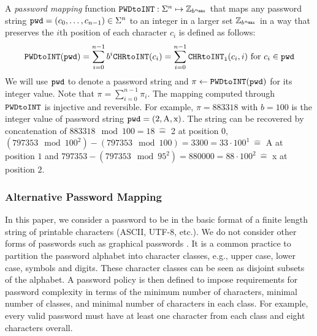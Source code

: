 A \emph{password mapping} function $\texttt{PWDtoINT}:\Sigma^n\mapsto\mathbb{Z}_{b^{{n_\mathtt{max}}}}$ that maps any password string $\mathtt{pwd}=(c_{0},\dots,c_{n-1})\in\Sigma^n$ to an integer in a larger set $\mathbb{Z}_{b^{{n_\mathtt{max}}}}$ in a way that preserves the $i$th position of each character $c_i$ is defined as follows:
\[
\texttt{PWDtoINT}(\mathtt{pwd}) = \sum_{i=0}^{n-1}b^{i} \texttt{CHRtoINT}(c_{i}) = \sum_{i=0}^{n-1}\texttt{CHRtoINT}_\texttt{i}(c_i, i) \textrm{ for } c_i\in\mathtt{pwd}
\]
We will use $\mathtt{pwd}$ to denote a password string and $\pi \gets \texttt{PWDtoINT}(\mathtt{pwd})$ for its integer value. Note that $\pi = \sum_{i=0}^{n-1}\pi_i$. %
The mapping computed through $\texttt{PWDtoINT}$ is injective and reversible. For example, $\pi = 883318$ with $b=100$ is the integer value of password string $\mathtt{pwd} = (\textrm{2},\textrm{A},\textrm{x})$. The string can be recovered by concatenation of $883318\mod 100=18~ \widehat{=}$ 2 at position 0, $(797353\mod 100^2)-(797353\mod 100)=3300=33\cdot 100^1~ \widehat{=}$ A at position $1$ and $797353-(797353\mod95^2)=880000=88\cdot 100^2~ \widehat{=}$ x at position $2$.

\subsubsection{Alternative Password Mapping}
In this paper, we consider a password to be in the basic format of a finite length string of printable characters (ASCII, UTF-8, etc.). 
We do not consider other forms of passwords such as graphical passwords \cite{suo05}. 
It is a common practice to partition the password alphabet into character classes, e.g., upper case, lower case, symbols and digits. 
These character classes can be seen as disjoint subsets of the alphabet. 
A password policy is then defined to impose requirements for password complexity in terms of the minimum number of characters, minimal number of classes, and minimal number of characters in each class.
For example, every valid password must have at least one character from each class and eight characters overall.


